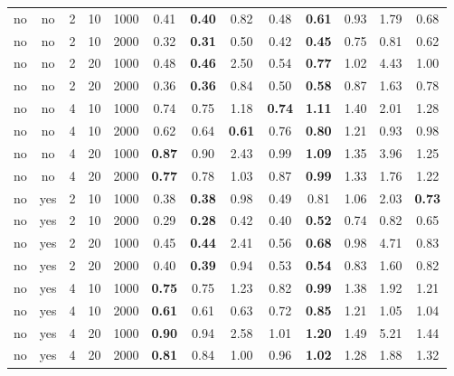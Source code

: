 \begin{table}[ht]
\begin{tabular}{||cc|rrr||cccc|cccc||}
   \hline
\hline
no & no & 2 & 10 & 1000 & 0.41 & \bf 0.40 & 0.82 & 0.48 & \bf 0.61 & 0.93 & 1.79 & 0.68 \\ 
  no & no & 2 & 10 & 2000 & 0.32 & \bf 0.31 & 0.50 & 0.42 & \bf 0.45 & 0.75 & 0.81 & 0.62 \\ 
  no & no & 2 & 20 & 1000 & 0.48 & \bf 0.46 & 2.50 & 0.54 & \bf 0.77 & 1.02 & 4.43 & 1.00 \\ 
  no & no & 2 & 20 & 2000 & 0.36 & \bf 0.36 & 0.84 & 0.50 & \bf 0.58 & 0.87 & 1.63 & 0.78 \\ 
   \hline
no & no & 4 & 10 & 1000 & 0.74 & 0.75 & 1.18 & \bf 0.74 & \bf 1.11 & 1.40 & 2.01 & 1.28 \\ 
  no & no & 4 & 10 & 2000 & 0.62 & 0.64 & \bf 0.61 & 0.76 & \bf 0.80 & 1.21 & 0.93 & 0.98 \\ 
  no & no & 4 & 20 & 1000 & \bf 0.87 & 0.90 & 2.43 & 0.99 & \bf 1.09 & 1.35 & 3.96 & 1.25 \\ 
  no & no & 4 & 20 & 2000 & \bf 0.77 & 0.78 & 1.03 & 0.87 & \bf 0.99 & 1.33 & 1.76 & 1.22 \\ 
   \hline
no & yes & 2 & 10 & 1000 & 0.38 & \bf 0.38 & 0.98 & 0.49 & 0.81 & 1.06 & 2.03 & \bf 0.73 \\ 
  no & yes & 2 & 10 & 2000 & 0.29 & \bf 0.28 & 0.42 & 0.40 & \bf 0.52 & 0.74 & 0.82 & 0.65 \\ 
  no & yes & 2 & 20 & 1000 & 0.45 & \bf 0.44 & 2.41 & 0.56 & \bf 0.68 & 0.98 & 4.71 & 0.83 \\ 
  no & yes & 2 & 20 & 2000 & 0.40 & \bf 0.39 & 0.94 & 0.53 & \bf 0.54 & 0.83 & 1.60 & 0.82 \\ 
   \hline
no & yes & 4 & 10 & 1000 & \bf 0.75 & 0.75 & 1.23 & 0.82 & \bf 0.99 & 1.38 & 1.92 & 1.21 \\ 
  no & yes & 4 & 10 & 2000 & \bf 0.61 & 0.61 & 0.63 & 0.72 & \bf 0.85 & 1.21 & 1.05 & 1.04 \\ 
  no & yes & 4 & 20 & 1000 & \bf 0.90 & 0.94 & 2.58 & 1.01 & \bf 1.20 & 1.49 & 5.21 & 1.44 \\ 
  no & yes & 4 & 20 & 2000 & \bf 0.81 & 0.84 & 1.00 & 0.96 & \bf 1.02 & 1.28 & 1.88 & 1.32 \\ 
   \hline
\hline
\end{tabular}
\end{table}
